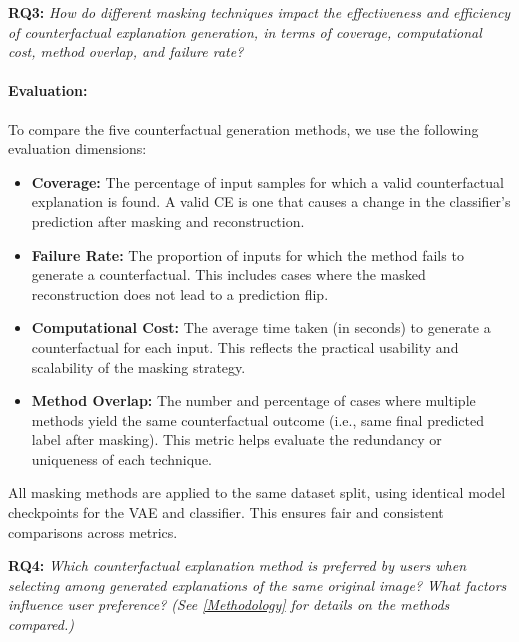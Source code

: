 \vspace{1em}
    
\textbf{RQ3:} \textit{How do different masking techniques impact the effectiveness and efficiency of counterfactual explanation generation, in terms of coverage, computational cost, method overlap, and failure rate?}

\vspace{-1em}



\paragraph{Evaluation:} To compare the five counterfactual generation methods, we use the following evaluation dimensions:
    \begin{itemize} 
        \item \textbf{Coverage:} The percentage of input samples for which a valid counterfactual explanation is found. A valid CE is one that causes a change in the classifier's prediction after masking and reconstruction.
        
        \item \textbf{Failure Rate:} The proportion of inputs for which the method fails to generate a counterfactual. This includes cases where the masked reconstruction does not lead to a prediction flip.
    
        \item \textbf{Computational Cost:} The average time taken (in seconds) to generate a counterfactual for each input. This reflects the practical usability and scalability of the masking strategy.
    
        \item \textbf{Method Overlap:} The number and percentage of cases where multiple methods yield the same counterfactual outcome (i.e., same final predicted label after masking). This metric helps evaluate the redundancy or uniqueness of each technique.

    \end{itemize}

    All masking methods are applied to the same dataset split, using identical model checkpoints for the VAE and classifier. This ensures fair and consistent comparisons across metrics.

\vspace{1em}

\textbf{RQ4:} \textit{ Which counterfactual explanation method is preferred by users when selecting among generated explanations of the same original image? What factors influence user preference? (See \cref{Methodology} for details on the methods compared.)}

